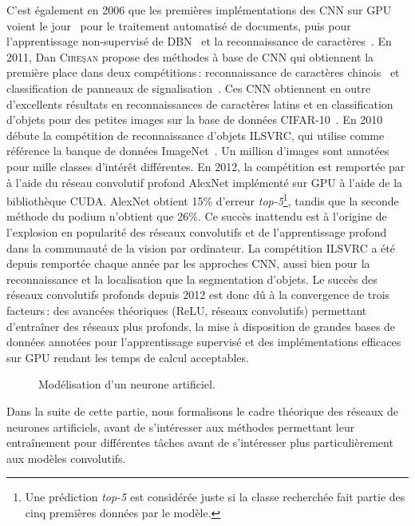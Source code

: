 C'est également en 2006 que les premières implémentations des \gls{CNN} sur \gls{GPU} voient le jour~\cite{chellapilla_high_2006} pour le traitement automatisé de documents, puis pour l'apprentissage non-supervisé de \gls{DBN}~\cite{raina_large-scale_2009} et la reconnaissance de caractères~\cite{ciresan_deep_2010}. En 2011, Dan \textsc{Cire\c{s}an} propose des méthodes à base de \gls{CNN} qui obtiennent la première place dans deux compétitions\,: reconnaissance de caractères chinois~\cite{liu_icdar_2011} et classification de panneaux de signalisation~\cite{stallkamp_german_2011}. Ces \gls{CNN} obtiennent en outre d'excellents résultats en reconnaissances de caractères latins et en classification d'objets pour des petites images sur la base de données CIFAR-10~\cite{ciresan_multi-column_2012}. En 2010 débute la compétition de reconnaissance d'objets \gls{ILSVRC}, qui utilise comme référence la banque de données ImageNet~\cite{deng_imagenet_2009}. Un million d'images sont annotées pour mille classes d'intérêt différentes. En 2012, la compétition est remportée par \citet*{krizhevsky_imagenet_2012} à l'aide du réseau convolutif profond AlexNet implémenté sur \gls{GPU} à l'aide de la bibliothèque \gls{CUDA}. AlexNet obtient 15\% d'erreur \emph{top-5}\footnote{Une prédiction \emph{top-5} est considérée juste si la classe recherchée fait partie des cinq premières données par le modèle.}, tandis que la seconde méthode du podium n'obtient que 26\%. Ce succès inattendu est à l'origine de l'explosion en popularité des réseaux convolutifs et de l'apprentissage profond dans la communauté de la vision par ordinateur. La compétition \gls{ILSVRC} a été depuis remportée chaque année par les approches \gls{CNN}, aussi bien pour la reconnaissance et la localisation que la segmentation d'objets. Le succès des réseaux convolutifs profonds depuis 2012 est donc dû à la convergence de trois facteurs\,: des avancées théoriques (\gls{ReLU}, réseaux convolutifs) permettant d'entraîner des réseaux plus profonds, la mise à disposition de grandes bases de données annotées pour l'apprentissage supervisé et des implémentations efficaces sur \gls{GPU} rendant les temps de calcul acceptables.

\begin{figure}[t]
  \resizebox{\textwidth}{!}{
  
  }
\caption{Modélisation d'un neurone artificiel.}
\label{fig:neurone}
\end{figure}

Dans la suite de cette partie, nous formalisons le cadre théorique des réseaux de neurones artificiels, avant de s'intéresser aux méthodes permettant leur entraînement pour différentes tâches avant de s'intéresser plus particulièrement aux modèles convolutifs.

